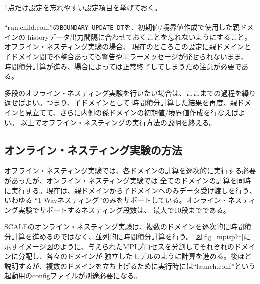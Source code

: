 1点だけ設定を忘れやすい設定項目を挙げておく。\\

\\

\noindent ``run.child.conf''の\verb|BOUNDARY_UPDATE_DT|を、初期値/境界値作成で使用した親ドメインの
historyデータ出力間隔に合わせておくことを忘れないようにすること。オフライン・ネスティング実験の場合、
現在のところこの設定に親ドメインと子ドメイン間で不整合あっても警告やエラーメッセージが発せられないまま、
時間積分計算が進み、場合によっては正常終了してしまうため注意が必要である。

多段のオフライン・ネスティング実験を行いたい場合は、ここまでの過程を繰り返せばよい。つまり、子ドメインとして
時間積分計算した結果を再度、親ドメインと見立てて、さらに内側の孫ドメインの初期値/境界値作成を行なえばよい。
以上でオフライン・ネスティングの実行方法の説明を終える。


\subsection{オンライン・ネスティング実験の方法} \label{sec:nest_online}

オフライン・ネスティング実験では、各ドメインの計算を逐次的に実行する必要があったが、オンライン・ネスティング実験では
全てのドメインの計算を同時に実行する。現在は、親ドメインから子ドメインへのみデータ受け渡しを行う、いわゆる
``1-Wayネスティング''のみをサポートしている。オンライン・ネスティング実験でサポートするネスティング段数は、
最大で10段までである。

SCALEのオンライン・ネスティング実験は、複数のドメインを逐次的に時間積分計算を進めるのではなく、並列的に時間積分計算を行う。
図\ref{fig_mpisplit}に示すイメージ図のように、与えられたMPIプロセスを分割してそれぞれのドメインに分配し、各々のドメインが
独立したモデルのように計算を進める。後ほど説明するが、複数のドメインを立ち上げるために実行時には``launch.conf''という
起動用のconfigファイルが別途必要になる。

